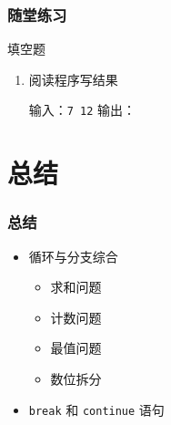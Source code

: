 	\begin{frame}[fragile]
		\frametitle{随堂练习}
		
		\begin{exampleblock}{填空题}
			
			\begin{enumerate}
				\item 阅读程序写结果
				
				
				输入：\lstinline|7 12| \tabto{8em} 	
				输出：\uncover<2->{\textcolor{red}{\lstinline|7 8 9|}}
			\end{enumerate}
			
		\end{exampleblock}
	\end{frame}
	
	\section{总结}
	
	\begin{frame}[fragile]
		\frametitle{总结}
		
		\begin{itemize}
			\item 循环与分支综合
			\begin{itemize}
				\item 求和问题
				\item 计数问题
				\item 最值问题
				\item 数位拆分
			\end{itemize}
			\item \lstinline|break| 和 \lstinline|continue| 语句
		\end{itemize}
	\end{frame}

